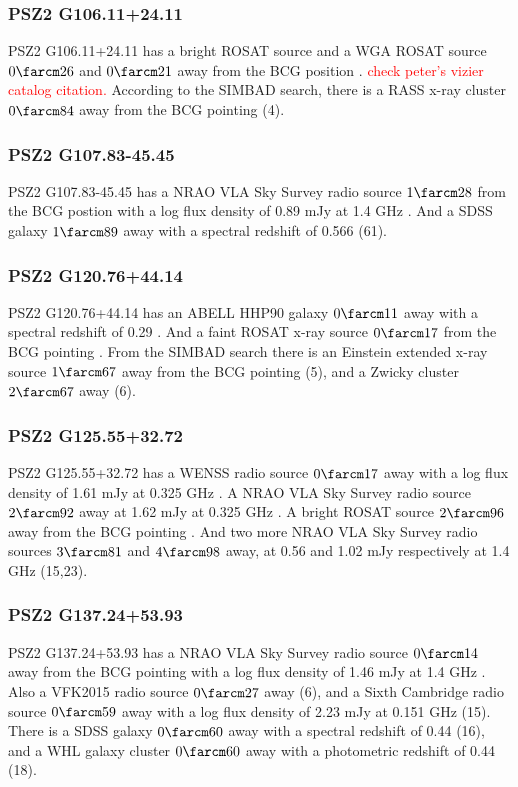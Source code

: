 \documentclass[apj, revtex4-1]{emulateapj}
\newcommand{\editorial}[1]{\textcolor{red}{#1}}
\begin{document}
\subsubsection{PSZ2 G106.11+24.11}
PSZ2 G106.11+24.11 has a bright ROSAT source and a WGA ROSAT source $0\farcm26$ and $0\farcm21$ away from the BCG position \citep{Voges1999a}. \editorial{check peter's vizier catalog citation.} According to the SIMBAD search, there is a RASS x-ray cluster $0\farcm84$ away from the BCG pointing (4).


\subsubsection{PSZ2 G107.83-45.45}
PSZ2 G107.83-45.45 has a NRAO VLA Sky Survey radio source $1\farcm28$ from the BCG postion with a log flux density of 0.89 mJy at 1.4 GHz \citep{Condon1998}. And a SDSS galaxy $1\farcm89$ away with a spectral redshift of 0.566 (61).

\subsubsection{PSZ2 G120.76+44.14}
PSZ2 G120.76+44.14 has an ABELL HHP90 galaxy $0\farcm11$ away with a spectral redshift of 0.29 \citep{Huchra1990}. And a faint ROSAT x-ray source $0\farcm17$ from the BCG pointing \citep{Voges2000}. From the SIMBAD search there is an Einstein extended x-ray source $1\farcm67$ away from the BCG pointing (5), and a Zwicky cluster $2\farcm67$ away (6).

\subsubsection{PSZ2 G125.55+32.72}
PSZ2 G125.55+32.72 has a WENSS radio source $0\farcm17$ away with a log flux density of 1.61 mJy at 0.325 GHz \citep{Rengelink1997}. A NRAO VLA Sky Survey radio source $2\farcm92$ away at 1.62 mJy at 0.325 GHz \citep{Condon1998}. A bright ROSAT source $2\farcm96$ away from the BCG pointing \citep{Voges1999a}. And two more NRAO VLA Sky Survey radio sources $3\farcm81$ and $4\farcm98$ away, at 0.56 and 1.02 mJy respectively at 1.4 GHz (15,23).

\subsubsection{PSZ2 G137.24+53.93}
PSZ2 G137.24+53.93 has a NRAO VLA Sky Survey radio source $0\farcm14$ away from the BCG pointing with a log flux density of 1.46 mJy at 1.4 GHz \citep{Condon1998}. Also a VFK2015 radio source $0\farcm27$ away (6), and a Sixth Cambridge radio source $0\farcm59$ away with a log flux density of 2.23 mJy at 0.151 GHz (15). There is a SDSS galaxy $0\farcm60$ away with a spectral redshift of 0.44 (16), and a WHL galaxy cluster $0\farcm60$ away with a photometric redshift of 0.44 (18).
\end{document}
